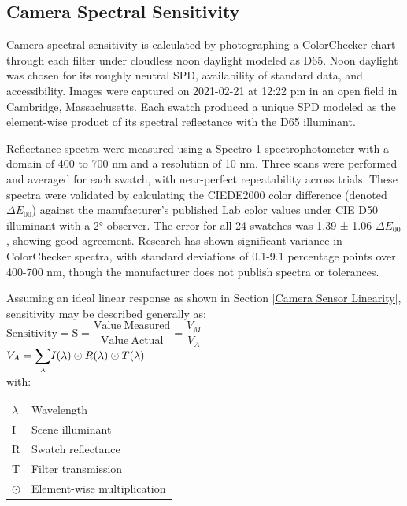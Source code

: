 \documentclass[twocolumn,10pt]{asme2ej}
\newcommand{\id}{\hspace{6 mm}}
\begin{document}
\subsection{Camera Spectral Sensitivity}
\label{Camera_Spectral_Sensitivity}

Camera spectral sensitivity is calculated by photographing a ColorChecker chart through each filter under cloudless noon daylight modeled as D65. Noon daylight was chosen for its roughly neutral SPD, availability of standard data, and accessibility. Images were captured on 2021-02-21 at 12:22 pm in an open field in Cambridge, Massachusetts. Each swatch produced a unique SPD modeled as the element-wise product of its spectral reflectance with the D65 illuminant. \cite{CVRL}

\id Reflectance spectra were measured using a Spectro 1 spectrophotometer with a domain of 400 to 700 nm and a resolution of 10 nm. Three scans were performed and averaged for each swatch, with near-perfect repeatability across trials. These spectra were validated by calculating the CIEDE2000 color difference (denoted $\Delta E_{00}$) against the manufacturer's published Lab color values under CIE D50 illuminant with a 2° observer. \cite{X-Rite} The error for all 24 swatches was 1.39 ± 1.06 $\Delta E_{00}$, showing good agreement. Research has shown significant variance in ColorChecker spectra, with standard deviations of 0.1-9.1 percentage points over 400-700 nm, though the manufacturer does not publish spectra or tolerances. \cite{BabelColor}

\id Assuming an ideal linear response as shown in Section \ref{Camera Sensor Linearity}, sensitivity may be described generally as:\\

$\mathrm{ Sensitivity = S = \dfrac{Value \ Measured}{Value \ Actual} } = \dfrac{V_M}{V_A}$ \\

$V_A = \mathlarger{\sum_{\lambda}} I(\lambda) \odot R(\lambda) \odot T(\lambda)$ \\

with: \\

\begin{tabular}{l | l}
$\lambda$ & Wavelength \\
I & Scene illuminant\\
R & Swatch reflectance \\
T & Filter transmission \\
$\odot$ & Element-wise multiplication \\
\end{tabular} \\
\end{document}
